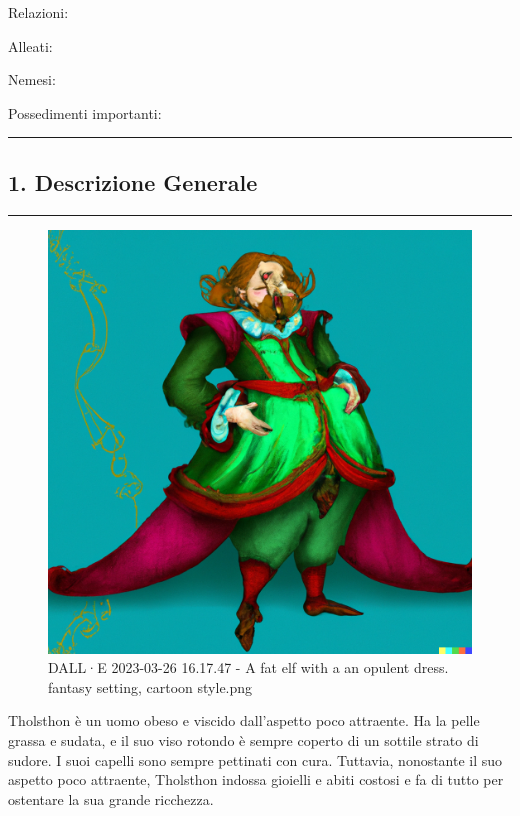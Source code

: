 Relazioni:

Alleati:

Nemesi:

Possedimenti importanti:

\begin{center}\rule{0.5\linewidth}{0.5pt}\end{center}

\subsection{1. Descrizione Generale}\label{descrizione-generale}

\begin{center}\rule{0.5\linewidth}{0.5pt}\end{center}

\begin{figure}
\centering
\includegraphics{DALLE_2023-03-26_16.17.47_-_A_fat_elf_with_a_an_opulent_dress._fantasy_setting_cartoon_style.png}
\caption{DALL·E 2023-03-26 16.17.47 - A fat elf with a an opulent dress.
fantasy setting, cartoon style.png}
\end{figure}

Tholsthon è un uomo obeso e viscido dall'aspetto poco attraente. Ha la
pelle grassa e sudata, e il suo viso rotondo è sempre coperto di un
sottile strato di sudore. I suoi capelli sono sempre pettinati con cura.
Tuttavia, nonostante il suo aspetto poco attraente, Tholsthon indossa
gioielli e abiti costosi e fa di tutto per ostentare la sua grande
ricchezza.

